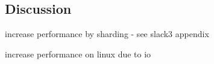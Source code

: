 \subsection{Discussion}

increase performance by sharding - see slack3 appendix

increase performance on linux due to io